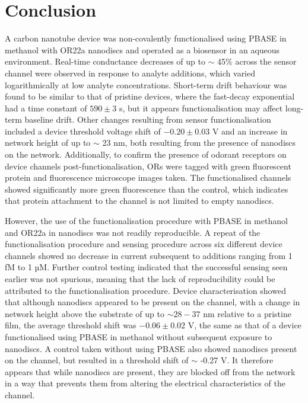 \documentclass[
  a4paper,
]{scrbook}
\begin{document}
\hypertarget{conclusion}{%
\section{Conclusion}\label{conclusion}}

A carbon nanotube device was non-covalently functionalised using PBASE
in methanol with OR22a nanodiscs and operated as a biosensor in an
aqueous environment. Real-time conductance decreases of up to \(\sim\)
45\% across the sensor channel were observed in response to analyte
additions, which varied logarithmically at low analyte concentrations.
Short-term drift behaviour was found to be similar to that of pristine
devices, where the fast-decay exponential had a time constant of
\(590\pm3\) s, but it appears functionalisation may affect long-term
baseline drift. Other changes resulting from sensor functionalisation
included a device threshold voltage shift of \(-0.20\pm0.03\) V and an
increase in network height of up to \(\sim\) 23 nm, both resulting from
the presence of nanodiscs on the network. Additionally, to confirm the
presence of odorant receptors on device channels post-functionalisation,
ORs were tagged with green fluorescent protein and fluorescence
microscope images taken. The functionalised channels showed
significantly more green fluorescence than the control, which indicates
that protein attachment to the channel is not limited to empty
nanodiscs.

However, the use of the functionalisation procedure with PBASE in
methanol and OR22a in nanodiscs was not readily reproducible. A repeat
of the functionalisation procedure and sensing procedure across six
different device channels showed no decrease in current subsequent to
additions ranging from 1 fM to 1 µM. Further control testing indicated
that the successful sensing seen earlier was not spurious, meaning that
the lack of reproducibility could be attributed to the functionalisation
procedure. Device characterisation showed that although nanodiscs
appeared to be present on the channel, with a change in network height
above the substrate of up to \(\sim 28-37\) nm relative to a pristine
film, the average threshold shift was \(-0.06\pm0.02\) V, the same as
that of a device functionalised using PBASE in methanol without
subsequent exposure to nanodiscs. A control taken without using PBASE
also showed nanodiscs present on the channel, but resulted in a
threshold shift of \(\sim\) -0.27 V. It therefore appears that while
nanodiscs are present, they are blocked off from the network in a way
that prevents them from altering the electrical characteristics of the
channel.
\end{document}
